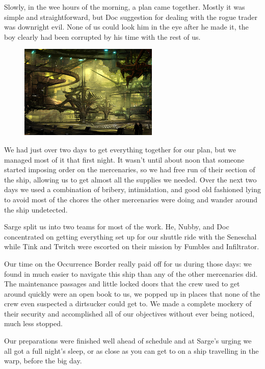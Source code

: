 Slowly, in the wee hours of the morning, a plan came together. 
Mostly it was simple and straightforward, but Doc suggestion for dealing with the rogue trader was downright evil. 
None of us could look him in the eye after he made it, the boy clearly had been corrupted by his time with the rest of us.

\begin{figure}
	\begin{center}
		\includegraphics[width=\figwidth]{pics/10/59.png}
	\end{center}
\end{figure}
We had just over two days to get everything together for our plan, but we managed most of it that first night. 
It wasn't until about noon that someone started imposing order on the mercenaries, so we had free run of their section of the ship, allowing us to get almost all the supplies we needed. 
Over the next two days we used a combination of bribery, intimidation, and good old fashioned lying to avoid most of the chores the other mercenaries were doing and wander around the ship undetected. 


Sarge split us into two teams for most of the work. 
He, Nubby, and Doc concentrated on getting everything set up for our shuttle ride with the Seneschal while Tink and Twitch were escorted on their mission by Fumbles and Infiltrator. 


Our time on the Occurrence Border really paid off for us during those days: 
we found in much easier to navigate this ship than any of the other mercenaries did. 
The maintenance passages and little locked doors that the crew used to get around quickly were an open book to us, we popped up in places that none of the crew even suspected a dirtsucker could get to. 
We made a complete mockery of their security and accomplished all of our objectives without ever being noticed, much less stopped.

Our preparations were finished well ahead of schedule and at Sarge's urging we all got a full night's sleep, or as close as you can get to on a ship travelling in the warp, before the big day.

